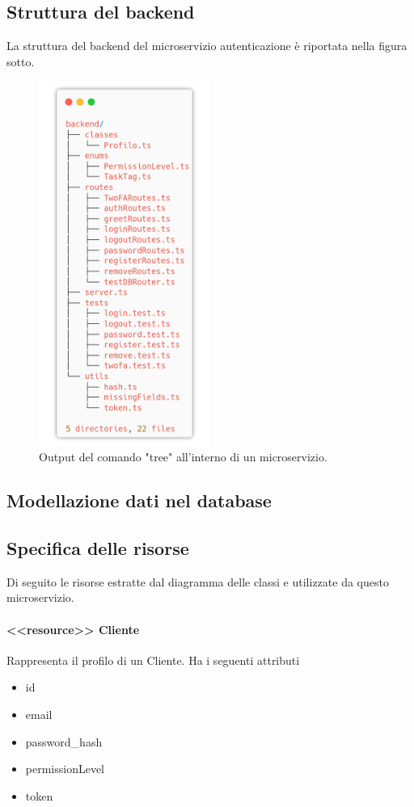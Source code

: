 \documentclass{report}
\begin{document}
\subsection*{Struttura del backend}
La struttura del backend del microservizio autenticazione è riportata
nella figura sotto.
\begin{figure}[H]
	\centering\includegraphics[width=0.5\textwidth]{images/microservizio-autenticazione/backend-structure.png}
	\caption{Output del comando "tree" all'interno di un microservizio.}
\end{figure}

\subsection*{Modellazione dati nel database}
\subsection*{Specifica delle risorse}
Di seguito le risorse estratte dal diagramma delle classi e utilizzate da questo microservizio.
\paragraph*{<<resource>> Cliente}
Rappresenta il profilo di un Cliente.
Ha i seguenti attributi
\begin{itemize}
	\item id
	\item email
	\item password\_hash
	\item permissionLevel
	\item token
\end{itemize}
\end{document}
